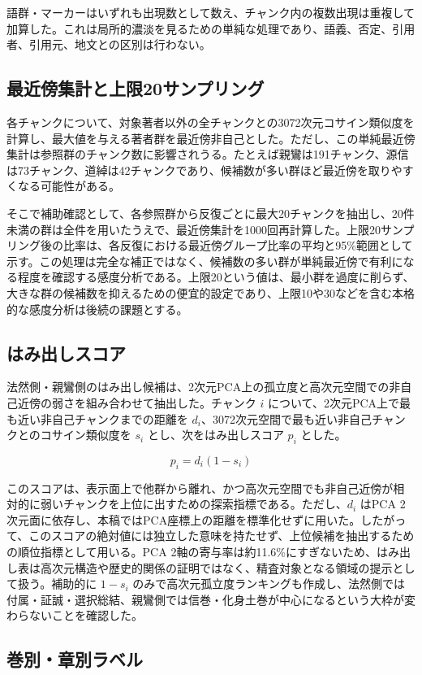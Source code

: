 \documentclass[uplatex,dvipdfmx,11pt,a4paper]{jsarticle}
\begin{document}
語群・マーカーはいずれも出現数として数え、チャンク内の複数出現は重複して加算した。これは局所的濃淡を見るための単純な処理であり、語義、否定、引用者、引用元、地文との区別は行わない。

\subsection{最近傍集計と上限20サンプリング}

各チャンクについて、対象著者以外の全チャンクとの3072次元コサイン類似度を計算し、最大値を与える著者群を最近傍非自己とした。ただし、この単純最近傍集計は参照群のチャンク数に影響されうる。たとえば親鸞は191チャンク、源信は73チャンク、道綽は42チャンクであり、候補数が多い群ほど最近傍を取りやすくなる可能性がある。

そこで補助確認として、各参照群から反復ごとに最大20チャンクを抽出し、20件未満の群は全件を用いたうえで、最近傍集計を1000回再計算した。上限20サンプリング後の比率は、各反復における最近傍グループ比率の平均と95\%範囲として示す。この処理は完全な補正ではなく、候補数の多い群が単純最近傍で有利になる程度を確認する感度分析である。上限20という値は、最小群を過度に削らず、大きな群の候補数を抑えるための便宜的設定であり、上限10や30などを含む本格的な感度分析は後続の課題とする。

\subsection{はみ出しスコア}

法然側・親鸞側のはみ出し候補は、2次元PCA上の孤立度と高次元空間での非自己近傍の弱さを組み合わせて抽出した。チャンク \(i\) について、2次元PCA上で最も近い非自己チャンクまでの距離を \(d_i\)、3072次元空間で最も近い非自己チャンクとのコサイン類似度を \(s_i\) とし、次をはみ出しスコア \(p_i\) とした。

\[
  p_i = d_i (1 - s_i)
\]

このスコアは、表示面上で他群から離れ、かつ高次元空間でも非自己近傍が相対的に弱いチャンクを上位に出すための探索指標である。ただし、\(d_i\) はPCA 2次元面に依存し、本稿ではPCA座標上の距離を標準化せずに用いた。したがって、このスコアの絶対値には独立した意味を持たせず、上位候補を抽出するための順位指標として用いる。PCA 2軸の寄与率は約11.6\%にすぎないため、はみ出し表は高次元構造や歴史的関係の証明ではなく、精査対象となる領域の提示として扱う。補助的に \(1-s_i\) のみで高次元孤立度ランキングも作成し、法然側では付属・証誠・選択総結、親鸞側では信巻・化身土巻が中心になるという大枠が変わらないことを確認した。

\subsection{巻別・章別ラベル}
\end{document}
